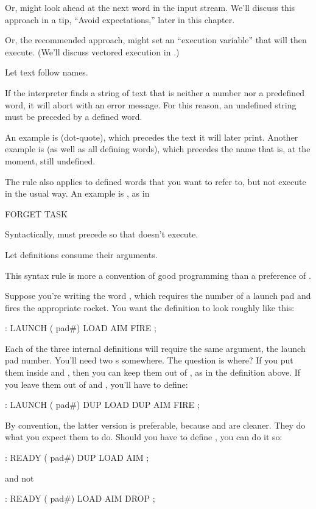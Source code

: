 Or,  might look ahead at the next word in the input stream.
We'll discuss this approach in a tip, ``Avoid expectations,'' later in this
chapter.

Or, the recommended approach,  might set an ``execution
variable'' that  will then execute. (We'll discuss vectored
execution in .)

\begin{tip}
Let text follow names.
\end{tip}
If the \Forth{} interpreter finds a string of text that is neither a number
nor a predefined word, it will abort with an error message. For this
reason, an undefined string must be preceded by a defined word.

An example is  (dot-quote), which precedes the text it will
later print. Another example is  (as well as all defining
words), which precedes the name that is, at the moment, still undefined.

The rule also applies to defined words that you want to refer to, but
not execute in the usual way. An example is , as in

\begin{Code}
FORGET TASK
\end{Code}
Syntactically,  must precede  so that
 doesn't execute.

\begin{tip}
Let definitions consume their arguments.
\end{tip}
This syntax rule is more a convention of good \Forth{} programming
than a preference of \Forth{}.

Suppose you're writing the word , which requires the
number of a launch pad and fires the appropriate rocket. You want the
definition to look roughly like this:
\begin{Code}
: LAUNCH  ( pad#)  LOAD  AIM  FIRE ;
\end{Code}
Each of the three internal definitions will require the same argument, the
launch pad number. You'll need two s somewhere. The question
is where? If you put them inside  and , then you
can keep them out of , as in the definition above. If you
leave them out of  and , you'll have to define:
\begin{Code}
: LAUNCH  ( pad#)  DUP LOAD  DUP AIM  FIRE ;
\end{Code}
By convention, the latter version is preferable, because  and
 are cleaner. They do what you expect them to do. Should you
have to define , you can do it so:
\begin{Code}
: READY  ( pad#)  DUP LOAD  AIM ;
\end{Code}
and not
\begin{Code}
: READY  ( pad#)  LOAD  AIM  DROP ;
\end{Code}

